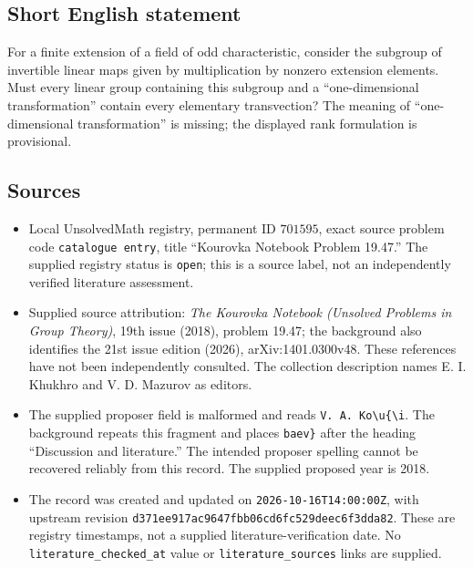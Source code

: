 \documentclass[11pt]{article}
\begin{document}
\subsection{Short English statement}
For a finite extension of a field of odd characteristic, consider the subgroup of invertible linear maps given by multiplication by nonzero extension elements. Must every linear group containing this subgroup and a ``one-dimensional transformation'' contain every elementary transvection? The meaning of ``one-dimensional transformation'' is missing; the displayed rank formulation is provisional.
\subsection{Sources}
\begin{itemize}
\item Local UnsolvedMath registry, permanent ID \(701595\), exact source problem code \texttt{catalogue entry}, title ``Kourovka Notebook Problem 19.47.'' The supplied registry status is \texttt{open}; this is a source label, not an independently verified literature assessment.
\item Supplied source attribution: \emph{The Kourovka Notebook (Unsolved Problems in Group Theory)}, 19th issue (2018), problem 19.47; the background also identifies the 21st issue edition (2026), arXiv:1401.0300v48. These references have not been independently consulted. The collection description names E. I. Khukhro and V. D. Mazurov as editors.
\item The supplied proposer field is malformed and reads \texttt{V. A. Ko\textbackslash u\{\textbackslash i}. The background repeats this fragment and places \texttt{baev\}} after the heading ``Discussion and literature.'' The intended proposer spelling cannot be recovered reliably from this record. The supplied proposed year is 2018.
\item The record was created and updated on \texttt{2026-10-16T14:00:00Z}, with upstream revision \texttt{d371ee917ac9647fbb06cd6fc529deec6f3dda82}. These are registry timestamps, not a supplied literature-verification date. No \texttt{literature\_checked\_at} value or \texttt{literature\_sources} links are supplied.
\end{itemize}
\end{document}
